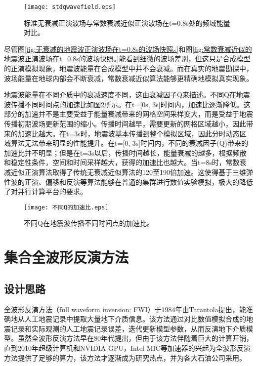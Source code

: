 \begin{figure}[ht]
\centering
\texttt{[image: stdqwavefield.eps]}
\caption{标准无衰减正演波场与常数衰减近似正演波场在t=0.8s处的频域能量对比。}
\label{fig:stdqwavefield}
\end{figure}

尽管图\ref{fig:无衰减的地震波正演波场在t=0.8s的波场快照。}和图\ref{fig:常数衰减近似的地震波正演波场在t=0.8s的波场快照。}能看到细微的波场差别，但这只是合成模型的正演模拟现象，地震波能量在合成模型中并不会衰减。而在真实的地震勘探中，波场能量在地球内部会不断衰减，常数衰减近似算法能够更精确地模拟真实现象。

地震波能量在不同介质中的衰减速度不同，这由衰减因子Q来描述。不同Q在地震波传播不同时间点的加速比如图\ref{fig:diffqspeedup}所示。在t=[0s, 3s]时间内，加速比逐渐降低。这部分的加速并不是主要受益于能量衰减带来的网格空间采样变大，而是受益于地震传播初期波场更新范围的缩小。传播时间越早，需要更新的网格区域越小，因此带来的加速比越大。在t=3s时，地震波基本传播到整个模拟区域，因此分时动态区域算法无法带来明显的性能提升。在t=[0, 3s]时间内，不同的衰减因子(Q)带来的加速比并不明显；但是在t=3s以后，传播时间越长，能量衰减的越多，根据频散和稳定性条件，空间和时间采样越大，获得的加速比也越大。当t=8s时，常数衰减近似正演算法取得了传统无衰减近似算法的120至190倍加速。这使得基于三维弹性波的正演、偏移和反演等算法能够在普通的集群进行数值实验模拟，极大的降低了对并行计算平台的要求。

\begin{figure}[ht]
\centering
\texttt{[image: 不同Q的加速比.eps]}
\caption{不同Q在地震波传播不同时间点的加速比。}
\label{fig:diffqspeedup}
\end{figure}


\section{集合全波形反演方法}

\subsection{设计思路}
全波形反演方法（full waveform inversion; FWI）于1984年由Tarantola提出，能准确地从人工地震记录中提取大量地下介质信息\cite{tarantola1984inversion,plessix2012full,brossier2009seismic}。该方法通过对比数值模拟合成的地震记录和实际观测的人工地震记录误差，迭代更新模型参数，从而反演地下介质模型\cite{yushu}。虽然全波形反演方法早在80年代提出，但由于该方法伴随着巨大的计算开销，直到2010年超级计算机和NVIDIA GPU，Intel MIC等加速器的兴起为全波形反演方法提供了足够的算力，该方法才逐渐成为研究热点，并为各大石油公司采用。

